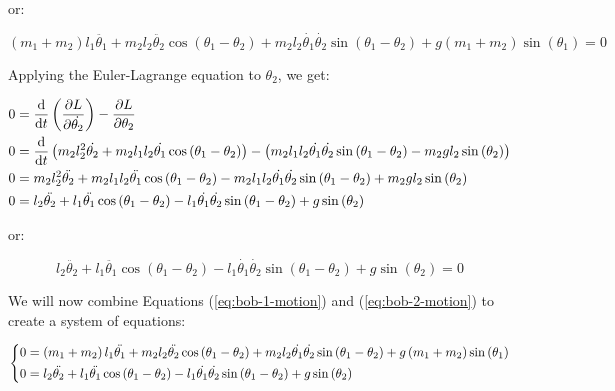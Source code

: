or:

\begin{equation}
    \left(m_1 + m_2\right)l_1\ddot{\theta_1} + m_2l_2\ddot{\theta_2}\cos\left(\theta_1 - \theta_2\right) + m_2l_2\dot{\theta_1}\dot{\theta_2}\sin\left(\theta_1 - \theta_2\right) + g\left(m_1 + m_2\right)\sin\left(\theta_1\right) = 0
    \label{eq:bob-1-motion}
\end{equation}

Applying the Euler-Lagrange equation to $\theta_2$, we get:

\begin{align*}
    0 &= \diff[]{}{t}\left(\pdiff[]{L}{\dot{\theta_2}}\right) - \pdiff[]{L}{\theta_2}\\
    0 &= \diff[]{}{t}\left(m_2l_2^2\dot{\theta_2} + m_2l_1l_2\dot{\theta_1}\cos\left(\theta_1 - \theta_2\right)\right) - \left(m_2l_1l_2\dot{\theta_1}\dot{\theta_2}\sin\left(\theta_1 - \theta_2\right) - m_2gl_2\sin\left(\theta_2\right)\right)\\
    0 &= m_2l_2^2\ddot{\theta_2} + m_2l_1l_2\ddot{\theta_1}\cos\left(\theta_1 - \theta_2\right) - m_2l_1l_2\dot{\theta_1}\dot{\theta_2}\sin\left(\theta_1 - \theta_2\right) + m_2gl_2\sin\left(\theta_2\right)\\
    0 &= l_2\ddot{\theta_2} + l_1\ddot{\theta_1}\cos\left(\theta_1 - \theta_2\right) - l_1\dot{\theta_1}\dot{\theta_2}\sin\left(\theta_1 - \theta_2\right) + g\sin\left(\theta_2\right)
\end{align*}

or:

\begin{equation}
    l_2\ddot{\theta_2} + l_1\ddot{\theta_1}\cos\left(\theta_1 - \theta_2\right) - l_1\dot{\theta_1}\dot{\theta_2}\sin\left(\theta_1 - \theta_2\right) + g\sin\left(\theta_2\right) = 0
    \label{eq:bob-2-motion}
\end{equation}

We will now combine Equations (\ref{eq:bob-1-motion}) and (\ref{eq:bob-2-motion}) to create a system of equations:

\begin{equation*}
    \begin{dcases}
        \begin{aligned}
            0 &= \left(m_1 + m_2\right)l_1\ddot{\theta_1} + m_2l_2\ddot{\theta_2}\cos\left(\theta_1 - \theta_2\right) + m_2l_2\dot{\theta_1}\dot{\theta_2}\sin\left(\theta_1 - \theta_2\right) + g\left(m_1 + m_2\right)\sin\left(\theta_1\right)\\
            0 &= l_2\ddot{\theta_2} + l_1\ddot{\theta_1}\cos\left(\theta_1 - \theta_2\right) - l_1\dot{\theta_1}\dot{\theta_2}\sin\left(\theta_1 - \theta_2\right) + g\sin\left(\theta_2\right)
        \end{aligned}
    \end{dcases}
\end{equation*}

